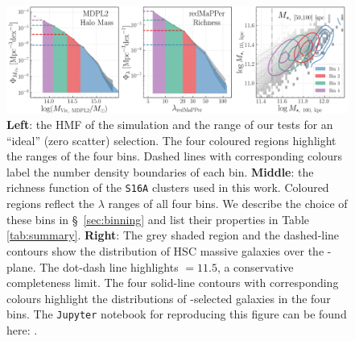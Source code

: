 \documentclass[fleqn,usenatbib,useAMS]{mnras}
\begin{document}
\begin{figure}
    \centering
    \includegraphics[width=\textwidth]{figure/fig_3}
    \caption{
        \textbf{Left}: the HMF of the  simulation and the \mvir{} range of our \topn{}
        tests for an ``ideal'' (zero scatter) \topn{} selection. 
        The four coloured regions highlight the \mvir{} ranges of the four \topn{} bins.
        Dashed lines with corresponding colours label the number density boundaries of each bin. 
        \textbf{Middle}: the richness function of the \texttt{S16A} \redm{} clusters used in this
        work. 
        Coloured regions reflect the $\lambda$ ranges of all four bins.
        We describe the choice of these bins in \S\ \ref{sec:binning} and list their properties
        in Table \ref{tab:summary}.
        \textbf{Right}:
        The grey shaded region and the dashed-line contours show the distribution of HSC
        massive galaxies over the - plane.
        The dot-dash line highlights \logmmax{}$=11.5$, a conservative  completeness
        limit.
        The four solid-line contours with corresponding colours highlight the distributions
        of -selected galaxies in the four \topn{} bins.
        The \texttt{Jupyter} notebook for reproducing this figure can be found here:
        \href{https://github.com/dr-guangtou/jianbing/blob/master/notebooks/figure/fig3.ipynb}{\faGithub}.
    }
    \label{fig:density_bins}
\end{figure}

\end{document}
